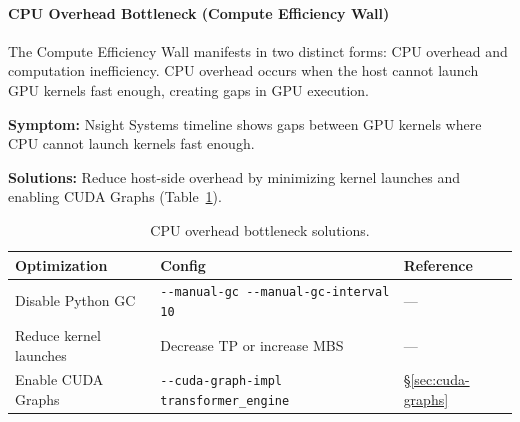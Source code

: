 \begin{table}[ht]
\centering
\caption{Communication bottleneck solutions.}
\label{tab:comm-bottleneck}
\end{table}

\paragraph*{CPU Overhead Bottleneck (Compute Efficiency Wall)}
The Compute Efficiency Wall manifests in two distinct forms: CPU overhead and computation inefficiency. CPU overhead occurs when the host cannot launch GPU kernels fast enough, creating gaps in GPU execution.

\noindent\textbf{Symptom:} Nsight Systems timeline shows gaps between GPU kernels where CPU cannot launch kernels fast enough.

\noindent\textbf{Solutions:} Reduce host-side overhead by minimizing kernel launches and enabling CUDA Graphs (Table~\ref{tab:cpu-bottleneck}).

\begin{table}[ht]
\centering
\caption{CPU overhead bottleneck solutions.}
\label{tab:cpu-bottleneck}
\begin{tabular}{lll}
\toprule
\textbf{Optimization} & \textbf{Config} & \textbf{Reference} \\
\midrule
Disable Python GC & \texttt{-{}-manual-gc -{}-manual-gc-interval 10} & --- \\
Reduce kernel launches & Decrease TP or increase MBS & --- \\
Enable CUDA Graphs & \texttt{-{}-cuda-graph-impl transformer\_engine} & \S\ref{sec:cuda-graphs} \\
\bottomrule
\end{tabular}
\end{table}

